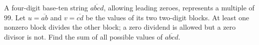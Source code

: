 A four-digit base-ten string $\overline{abcd}$, allowing leading zeroes, represents a multiple of $99$. Let $u=\overline{ab}$ and $v=\overline{cd}$ be the values of its two two-digit blocks. At least one nonzero block divides the other block; a zero dividend is allowed but a zero divisor is not. Find the sum of all possible values of $\overline{abcd}$.
